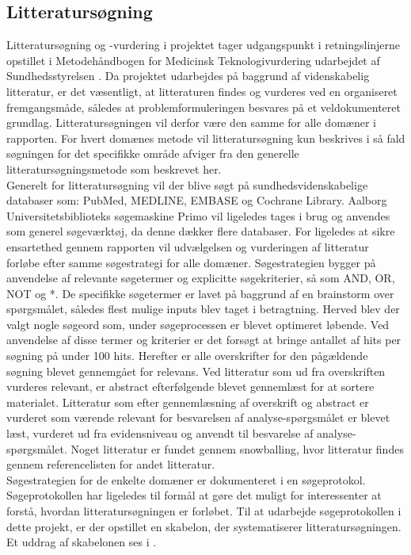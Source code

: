 \subsection{Litteratursøgning} \label{litteratursogning}
Litteratursøgning og -vurdering i projektet tager udgangspunkt i retningslinjerne opstillet i Metodehåndbogen for Medicinsk Teknologivurdering udarbejdet af Sundhedsstyrelsen \citep{metodehaandbogen}. Da projektet udarbejdes på baggrund af videnskabelig litteratur, er det væsentligt, at litteraturen findes og vurderes ved en organiseret fremgangsmåde, således at problemformuleringen besvares på et veldokumenteret grundlag. Litteratursøgningen vil derfor være den samme for alle domæner i rapporten. For hvert domænes metode vil litteratursøgning kun beskrives i så fald søgningen for det specifikke område afviger fra den generelle litteratursøgningsmetode som beskrevet her. \\
Generelt for litteratursøgning vil der blive søgt på sundhedsvidenskabelige databaser som: PubMed, MEDLINE, EMBASE og Cochrane Library. Aalborg Universitetsbiblioteks søgemaskine Primo vil ligeledes tages i brug og anvendes som generel søgeværktøj, da denne dækker flere databaser. For ligeledes at sikre ensartethed gennem rapporten vil udvælgelsen og vurderingen af litteratur forløbe efter samme søgestrategi for alle domæner. Søgestrategien bygger på anvendelse af relevante søgetermer og explicitte søgekriterier, så som AND, OR, NOT og *.  De specifikke søgetermer er lavet på baggrund af en brainstorm over spørgsmålet, således flest mulige inputs blev taget i betragtning. Herved blev der valgt nogle søgeord som, under søgeprocessen er blevet optimeret løbende. Ved anvendelse af disse termer og kriterier er det forsøgt at bringe antallet af hits per søgning på under 100 hits. Herefter er alle overskrifter for den pågældende søgning blevet gennemgået for relevans. Ved litteratur som ud fra overskriften vurderes relevant, er abstract efterfølgende blevet gennemlæst for at sortere materialet. Litteratur som efter gennemlæsning af overskrift og abstract er vurderet som værende relevant for besvarelsen af analyse-spørgsmålet er blevet læst, vurderet ud fra evidensniveau og anvendt til besvarelse af analyse-spørgsmålet. Noget litteratur er fundet gennem snowballing, hvor litteratur findes gennem referencelisten for andet litteratur. \\ 
Søgestrategien for de enkelte domæner er dokumenteret i en søgeprotokol. Søgeprotokollen har ligeledes til formål at gøre det muligt for interessenter at forstå, hvordan litteratursøgningen er forløbet. \citep{metodehaandbogen} Til at udarbejde søgeprotokollen i dette projekt, er der opstillet en skabelon, der systematiserer litteratursøgningen. Et uddrag af skabelonen ses i .

